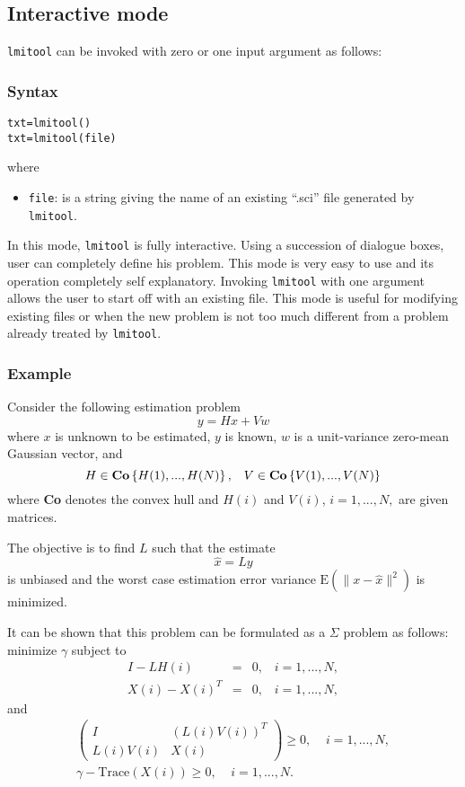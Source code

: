 \documentclass{article}
\begin{document}
\subsection{Interactive mode}
{\tt lmitool} can be invoked with zero or one input argument as
follows:

\subsubsection{Syntax}
\begin{verbatim}
txt=lmitool()
txt=lmitool(file)
\end{verbatim}
where
\begin{itemize}
\item
{\tt file}: is a string giving the name of an existing ``.sci'' file
generated by {\tt lmitool}.
\end{itemize}
In this mode, {\tt lmitool} is fully interactive. Using a succession
of dialogue boxes, user can completely define his problem. This
mode is very easy to use and its operation completely self explanatory.
Invoking {\tt lmitool} with one argument allows the user to start off 
with an existing file. This mode is useful for modifying existing files 
or when the new problem is not too much different
from a problem already treated by {\tt lmitool}.

\subsubsection{Example}
Consider the following estimation problem
\[
y = H x + V w
\]
where $x$ is unknown to be estimated, $y$ is known, $w$ is a
unit-variance zero-mean Gaussian vector, and
\[
H \in \mbox{\bf Co}\left\{ H(1),...,H(N) \right\},\;\;\;
V \in \mbox{\bf Co}\left\{ V(1),...,V(N) \right\}
\]
where {\bf Co} denotes the convex hull and $H(i)$ and $V(i)$, $i=1,...,N,$
are given matrices.

The objective is to find $L$ such that the estimate
\[
\hat{x}=Ly
\]
is unbiased and the worst case estimation error variance
$\mbox{E}(\|x-\hat{x}\|^2)$ is minimized.

It can be shown that this problem can be formulated as a $\Sigma$
problem as follows: minimize $\gamma$ subject to
\begin{eqnarray*}
I-LH(i) &=& 0 ,\;\;\;i=1,...,N,\\
X(i)-X(i)^T&=& 0,\;\;\;i=1,...,N,
\end{eqnarray*}
and
\begin{eqnarray*}
\left( \begin{array} {cc} I & (L(i)V(i))^T\\
                        L(i)V(i) & X(i) 
         \end{array}  \right)  \geq 0,\;\;\;\;i=1,...,N, \\
\gamma-\mbox{Trace}(X(i)) \geq 0,\;\;\;\;i=1,...,N.
\end{eqnarray*}
\end{document}
